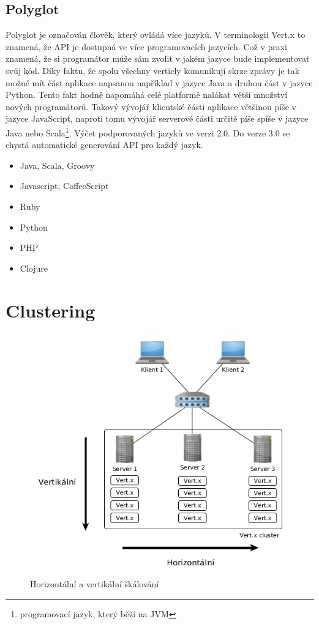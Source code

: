 \subsection{Polyglot}

Polyglot je označován člověk, který ovládá více jazyků. V terminologii Vert.x to znamená, že API je dostupná ve více programovacích jazycích. Což v praxi znamená, že si programátor může sám zvolit v jakém jazyce bude implementovat svůj kód. Díky faktu, že spolu všechny verticly komunikují skrze zprávy je tak možné mít část aplikace napsanou například v jazyce Java a druhou část v jazyce Python. Tento fakt hodně napomáhá celé platformě nalákat větší množství nových programátorů. Takový vývojář klientské části aplikace většinou píše v jazyce JavaScript, naproti tomu vývojář serverové části určitě píše spíše v jazyce Java nebo Scala\footnote{programovací jazyk, který běží na JVM}. Výčet podporovaných jazyků ve verzi 2.0. Do verze 3.0 se chystá automatické generování API pro každý jazyk.

\begin{itemize}
\item{Java, Scala, Groovy}
\item{Javascript, CoffeeScript}
\item{Ruby}
\item{Python}
\item{PHP}
\item{Clojure}
\end{itemize}

\section{Clustering}

\begin{figure}
\begin{centering}
\includegraphics[scale=0.5]{obrazky/scaling_example}
\par\end{centering}
\caption{Horizontální a vertikální škálování\label{fig:scaling_example}}
\end{figure}

